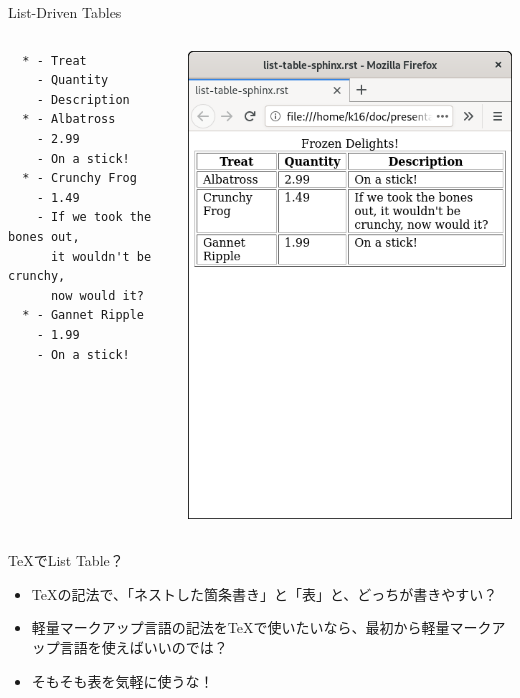 \documentclass[14pt,dvipdfmx,uplatex]{beamer}
\begin{document}
\begin{frame}[t,fragile=singleslide]{\inhibitglue List-Driven Tables}
\begin{center}
\begin{columns}[c]
\begin{column}{.5\textwidth}
\begin{tcolorbox}[left=1pt]
\begin{Verbatim}
  * - Treat
    - Quantity
    - Description
  * - Albatross
    - 2.99
    - On a stick!
  * - Crunchy Frog
    - 1.49
    - If we took the bones out,
      it wouldn't be crunchy,
      now would it?
  * - Gannet Ripple
    - 1.99
    - On a stick!
\end{Verbatim}
\end{tcolorbox}
      \end{column}
      \begin{column}{.4\textwidth}
        \includegraphics[width=.8\textwidth]{figures/list-table-result.png}
      \end{column}
    \end{columns}
  \end{center}
\end{frame}

\begin{frame}[t]{\inhibitglue \TeX{}でList Table？}
  \sffamily
  \begin{itemize}
    \item \TeX{}の記法で、「ネストした箇条書き」と「表」と、どっちが書きやすい？
    \item 軽量マークアップ言語の記法を\TeX{}で使いたいなら、最初から軽量マークアップ言語を使えばいいのでは？
    \item そもそも表を気軽に使うな！
  \end{itemize}
\end{frame}
\end{document}
